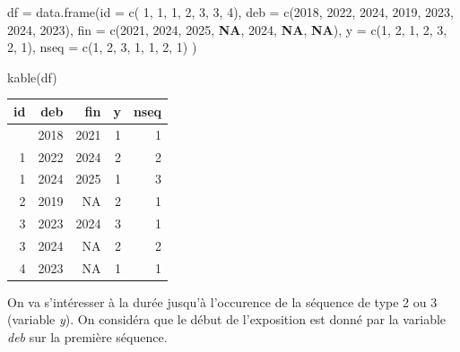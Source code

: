 \documentclass[
  12pt,
  letterpaper,
  DIV=11,
  numbers=noendperiod,
  onepage,
  openany]{scrreprt}
\newenvironment{Shaded}{\begin{snugshade}}{\end{snugshade}}
\newcommand{\AttributeTok}[1]{\textcolor[rgb]{0.80,0.80,0.80}{#1}}
\newcommand{\ConstantTok}[1]{\textcolor[rgb]{0.86,0.64,0.64}{\textbf{#1}}}
\newcommand{\DecValTok}[1]{\textcolor[rgb]{0.86,0.86,0.80}{#1}}
\newcommand{\FunctionTok}[1]{\textcolor[rgb]{0.94,0.94,0.56}{#1}}
\newcommand{\NormalTok}[1]{\textcolor[rgb]{0.80,0.80,0.80}{#1}}
\newcommand{\OtherTok}[1]{\textcolor[rgb]{0.94,0.94,0.56}{#1}}
\begin{document}
\begin{Shaded}
\begin{Highlighting}[]
\NormalTok{df }\OtherTok{=}  \FunctionTok{data.frame}\NormalTok{(}\AttributeTok{id  =}  \FunctionTok{c}\NormalTok{( }\DecValTok{1}\NormalTok{, }\DecValTok{1}\NormalTok{, }\DecValTok{1}\NormalTok{, }\DecValTok{2}\NormalTok{, }\DecValTok{3}\NormalTok{, }\DecValTok{3}\NormalTok{, }\DecValTok{4}\NormalTok{),}
                 \AttributeTok{deb =}  \FunctionTok{c}\NormalTok{(}\DecValTok{2018}\NormalTok{, }\DecValTok{2022}\NormalTok{, }\DecValTok{2024}\NormalTok{, }\DecValTok{2019}\NormalTok{, }\DecValTok{2023}\NormalTok{, }\DecValTok{2024}\NormalTok{, }\DecValTok{2023}\NormalTok{),}
                 \AttributeTok{fin =}  \FunctionTok{c}\NormalTok{(}\DecValTok{2021}\NormalTok{, }\DecValTok{2024}\NormalTok{, }\DecValTok{2025}\NormalTok{, }\ConstantTok{NA}\NormalTok{, }\DecValTok{2024}\NormalTok{, }\ConstantTok{NA}\NormalTok{, }\ConstantTok{NA}\NormalTok{), }
                 \AttributeTok{y  =}   \FunctionTok{c}\NormalTok{(}\DecValTok{1}\NormalTok{, }\DecValTok{2}\NormalTok{, }\DecValTok{1}\NormalTok{, }\DecValTok{2}\NormalTok{, }\DecValTok{3}\NormalTok{, }\DecValTok{2}\NormalTok{, }\DecValTok{1}\NormalTok{),}
                 \AttributeTok{nseq =} \FunctionTok{c}\NormalTok{(}\DecValTok{1}\NormalTok{, }\DecValTok{2}\NormalTok{, }\DecValTok{3}\NormalTok{, }\DecValTok{1}\NormalTok{, }\DecValTok{1}\NormalTok{, }\DecValTok{2}\NormalTok{, }\DecValTok{1}\NormalTok{)}
\NormalTok{                 )}

\FunctionTok{kable}\NormalTok{(df)}
\end{Highlighting}
\end{Shaded}

\begin{longtable}[]{@{}rrrrr@{}}
\toprule\noalign{}
id & deb & fin & y & nseq \\
\midrule\noalign{}
\endhead
\bottomrule\noalign{}
\endlastfoot
1 & 2018 & 2021 & 1 & 1 \\
1 & 2022 & 2024 & 2 & 2 \\
1 & 2024 & 2025 & 1 & 3 \\
2 & 2019 & NA & 2 & 1 \\
3 & 2023 & 2024 & 3 & 1 \\
3 & 2024 & NA & 2 & 2 \\
4 & 2023 & NA & 1 & 1 \\
\end{longtable}

On va s'intéresser à la durée jusqu'à l'occurence de la séquence de type
2 ou 3 (variable \emph{y}). On considéra que le début de l'exposition
est donné par la variable \emph{deb} sur la première séquence.
\end{document}
